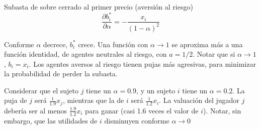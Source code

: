 \documentclass[12pt]{article}
\begin{document}
\begin{exbox}{Subasta de sobre cerrado al primer precio (aversión al riesgo)}
	\[
		\frac{\partial b_i^*}{\partial \alpha} =-\frac{x_i}{(1-\alpha)^2}
	\]

	Conforme $\alpha$ decrece, $b_i^*$ crece. Una función con $\alpha \rightarrow 1$ se aproxima más a una función identidad, de agentes neutrales al riesgo, con $a=1/2$. Notar que si $\alpha \rightarrow 1$, $b_i = x_i$. Los agentes aversos al riesgo tienen pujas más agresivas, para minimizar la probabilidad de perder la subasta.

	Considerar que el sujeto $j$ tiene un $\alpha = 0.9$, y un sujeto $i$ tiene un $\alpha=0.2$. La puja de $j$ será $\frac{1}{1.9}x_j$, mientras que la de $i$ será $\frac{1}{1.2}x_i$. La valuación del jugador $j$ debería ser al menos $\frac{1.9}{1.2}x_i$ para ganar (casi 1.6 veces el valor de $i$). Notar, sin embargo, que las utilidades de $i$ disminuyen conforme $\alpha \rightarrow 0$

	\newcommand\bidutil[1]{(x*(1-1/(1+#1)))^(#1)}

	\begin{center}
	\end{center}

\end{exbox}
\end{document}
